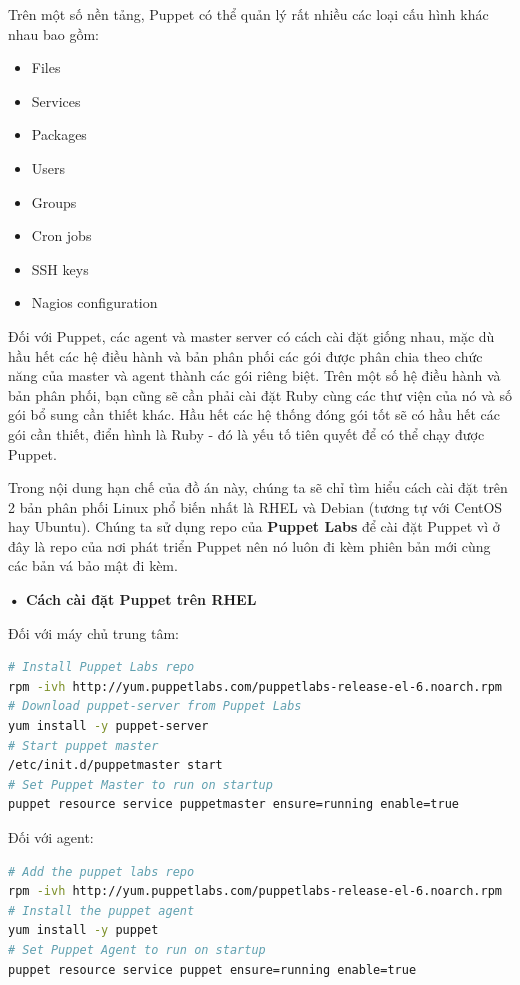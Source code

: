 Trên một số nền tảng, Puppet có thể quản lý rất nhiều các loại cấu hình khác nhau bao gồm:
\begin{itemize}
  \item Files
  \item Services
  \item Packages
  \item Users
  \item Groups
  \item Cron jobs
  \item SSH keys
  \item Nagios configuration
\end{itemize}

Đối với Puppet, các agent và master server có cách cài đặt giống nhau, mặc dù hầu hết các hệ điều hành và bản phân phối các gói được phân chia theo chức năng của master và agent thành các gói riêng biệt. Trên một số hệ điều hành và bản phân phối, bạn cũng sẽ cần phải cài đặt Ruby cùng các thư viện của nó và số gói bổ sung cần thiết khác. Hầu hết các hệ thống đóng gói tốt sẽ có hầu hết các gói cần thiết, điển hình là Ruby - đó là yếu tố tiên quyết để có thể chạy được Puppet.

Trong nội dung hạn chế của đồ án này, chúng ta sẽ chỉ tìm hiểu cách cài đặt trên 2 bản phân phối Linux phổ biến nhất là RHEL và Debian (tương tự với CentOS hay Ubuntu). Chúng ta sử dụng repo của \textbf{Puppet Labs} để cài đặt Puppet vì ở đây là repo của nơi phát triển Puppet nên nó luôn đi kèm phiên bản mới cùng các bản vá bảo mật đi kèm.

\textbf{• Cách cài đặt Puppet trên RHEL}

Đối với máy chủ trung tâm:

\begin{lstlisting}[label={lst:puppet_install_master_rhel},caption={Cách cài đặt puppet master trên RHEL}, language=bash, deletekeywords={enable, true}]
# Install Puppet Labs repo
rpm -ivh http://yum.puppetlabs.com/puppetlabs-release-el-6.noarch.rpm
# Download puppet-server from Puppet Labs
yum install -y puppet-server
# Start puppet master
/etc/init.d/puppetmaster start
# Set Puppet Master to run on startup
puppet resource service puppetmaster ensure=running enable=true
\end{lstlisting}

Đối với agent:

\begin{lstlisting}[label={lst:puppet_install_agent_rhel},caption={Cách cài đặt puppet agent trên RHEL}, language=bash, deletekeywords={enable, true}]
# Add the puppet labs repo
rpm -ivh http://yum.puppetlabs.com/puppetlabs-release-el-6.noarch.rpm
# Install the puppet agent
yum install -y puppet
# Set Puppet Agent to run on startup
puppet resource service puppet ensure=running enable=true
\end{lstlisting}

